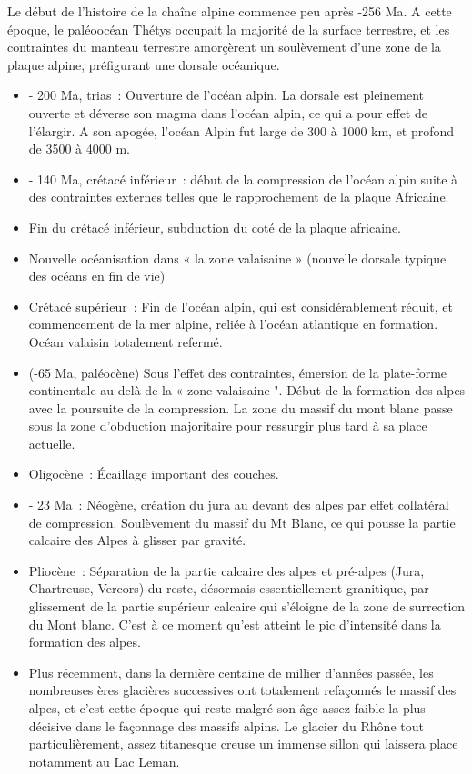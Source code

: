 \documentclass[a4paper,11pt]{article}
\begin{document}
Le début de l'histoire de la chaîne alpine commence peu après -256 Ma. A cette époque, le paléoocéan Thétys occupait la majorité de la surface terrestre, et les contraintes du manteau terrestre amorçèrent un soulèvement d'une zone de la plaque alpine, préfigurant une dorsale océanique.
\begin{itemize}
  \item - 200 Ma, trias~: Ouverture de l'océan alpin.
  La dorsale est pleinement ouverte et déverse son  magma dans l'océan alpin, ce qui a pour effet de l'élargir.
  A son apogée, l'océan Alpin fut large de 300 à 1000 km, et profond de 3500 à 4000 m. 
  \item - 140 Ma, crétacé inférieur~: début de la compression de l'océan alpin suite à des contraintes externes telles que le rapprochement de la plaque Africaine.
  \item Fin du crétacé inférieur, subduction du coté de la plaque africaine.
  \item Nouvelle océanisation dans « la zone valaisaine » (nouvelle dorsale typique des océans en fin de vie)
  \item Crétacé supérieur~: Fin de l'océan alpin, qui est considérablement réduit, et commencement de la mer alpine, reliée à l'océan atlantique en formation. Océan valaisin totalement refermé.
  \item (-65 Ma, paléocène) Sous l'effet des contraintes, émersion de la plate-forme continentale au delà de la « zone valaisaine ".
  Début de la formation des alpes avec la poursuite de la compression.
  La zone du massif du mont blanc passe sous la zone d'obduction majoritaire pour ressurgir plus tard à sa place actuelle.
  \item Oligocène~: Écaillage important des couches.
  \item - 23 Ma~: Néogène, création du jura au devant des alpes par effet collatéral de compression.
  Soulèvement du massif du Mt Blanc, ce qui pousse la partie calcaire des Alpes à glisser par gravité.
  \item Pliocène~: Séparation de la partie calcaire des alpes et pré-alpes (Jura, Chartreuse, Vercors) du reste, désormais essentiellement granitique, par glissement de la partie supérieur calcaire qui s'éloigne de la zone de surrection du Mont blanc.
  C'est à ce moment qu'est atteint le pic d'intensité dans la formation des alpes.
  \item Plus récemment, dans la dernière centaine de millier d'années passée, les nombreuses ères glacières successives ont totalement refaçonnés le massif des alpes, et c'est cette époque qui reste malgré son âge assez faible la plus décisive dans le façonnage des massifs alpins.
  Le glacier du Rhône tout particulièrement, assez titanesque creuse un immense sillon qui laissera place notamment au Lac Leman.
\end{itemize}
\end{document}
